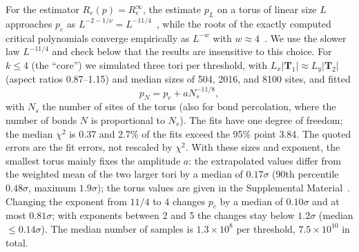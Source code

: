 \documentclass[pre,twocolumn,superscriptaddress,longbibliography,floatfix]{revtex4-2}
\newcommand{\pc}{p_c}
\begin{document}
For the estimator $R_e(p)=R_e^\infty$, the estimate $p_L$ on a torus of linear size $L$ approaches $\pc$ as $L^{-2-1/\nu}=L^{-11/4}$~\cite{NewmanZiff00,NewmanZiff01}, while the roots of the exactly computed critical polynomials converge empirically as $L^{-w}$ with $w\approx4$~\cite{MertensZiff16}. We use the slower law $L^{-11/4}$ and check below that the results are insensitive to this choice. For $k\le4$ (the ``core'') we simulated three tori per threshold, with $L_x|\mathbf T_1|\approx L_y|\mathbf T_2|$ (aspect ratios 0.87--1.15) and median sizes of 504, 2016, and 8100 sites, and fitted
\begin{equation}
p_N=\pc+aN_s^{-11/8},
\label{eq:fss}
\end{equation}
with $N_s$ the number of sites of the torus (also for bond percolation, where the number of bonds $N$ is proportional to $N_s$). The fits have one degree of freedom; the median $\chi^2$ is 0.37 and 2.7\% of the fits exceed the 95\% point 3.84. The quoted errors are the fit errors, not rescaled by $\chi^2$. With these sizes and exponent, the smallest torus mainly fixes the amplitude $a$: the extrapolated values differ from the weighted mean of the two larger tori by a median of $0.17\sigma$ (90th percentile $0.48\sigma$, maximum $1.9\sigma$); the torus values are given in the Supplemental Material~\cite{SM}. Changing the exponent from $11/4$ to $4$ changes $\pc$ by a median of $0.10\sigma$ and at most $0.81\sigma$; with exponents between 2 and 5 the changes stay below $1.2\sigma$ (median $\le0.14\sigma$). The median number of samples is $1.3\times10^8$ per threshold, $7.5\times10^{10}$ in total.
\end{document}
